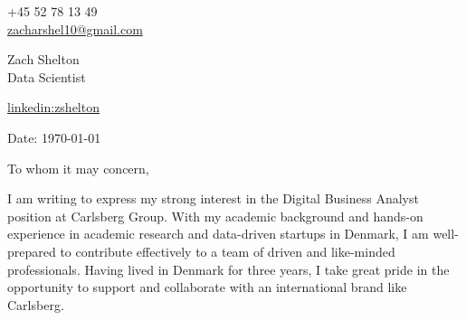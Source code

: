 \documentclass[11pt,a4]{article}
\begin{document}
\begin{center}
    \begin{minipage}[b]{0.24\textwidth}
            \large +45 52 78 13 49 \\
            \large \href{mailto:zshelton1997@gmail.com}{zacharshel10@gmail.com} 
    \end{minipage}%
    \begin{minipage}[b]{0.5\textwidth}
            \centering
            {\Huge Zach Shelton} \\ %
            \vspace{0.1cm}
            {\color{UI_blue} \Large{Data Scientist}} \\
    \end{minipage}%
    \begin{minipage}[b]{0.24\textwidth}
            \flushright \large
            {\href{https://www.linkedin.com/in/zshelton/}{linkedin:zshelton} } \\

    \end{minipage}   
    
\vspace{-0.15cm} 
{\color{UI_blue} \hrulefill}
\end{center}

\justify
\setlength{\parindent}{0pt}
\setlength{\parskip}{12pt}
\vspace{0.1cm}


Date: \today \par \vspace{-0.1cm}

To whom it may concern,

I am writing to express my strong interest in the Digital Business Analyst position at Carlsberg Group. With my academic background and hands-on experience in academic research and data-driven startups in Denmark, I am well-prepared to contribute effectively to a team of driven and like-minded professionals. Having lived in Denmark for three years, I take great pride in the opportunity to support and collaborate with an international brand like Carlsberg.
\end{document}
